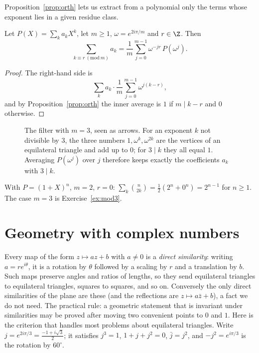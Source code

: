Proposition~\ref{prop:orth} lets us extract from a polynomial only the terms whose exponent lies in a given residue class.

\begin{theorem}\label{thm:filter}
Let $P(X)=\sum_k a_kX^k$, let $m\ge1$, $\omega=e^{2i\pi/m}$ and $r\in\Z$. Then
\[
\sum_{k\equiv r\ (\mathrm{mod}\ m)}a_k=\frac1m\sum_{j=0}^{m-1}\omega^{-jr}\,P\!\left(\omega^j\right).
\]
\end{theorem}
\begin{proof}
The right-hand side is
\[
\sum_ka_k\cdot\frac1m\sum_{j=0}^{m-1}\omega^{j(k-r)},
\]
and by Proposition~\ref{prop:orth} the inner average is $1$ if $m\mid k-r$ and $0$ otherwise.
\end{proof}

\begin{figure}[ht]
\centering
{}
\caption{The filter with $m=3$, seen as arrows. For an exponent $k$ not divisible by $3$, the three numbers $1,\omega^k,\omega^{2k}$ are the vertices of an equilateral triangle and add up to $0$; for $3\mid k$ they all equal $1$. Averaging $P(\omega^j)$ over $j$ therefore keeps exactly the coefficients $a_k$ with $3\mid k$.}
\label{fig:filter}
\end{figure}

\begin{example}
With $P=(1+X)^n$, $m=2$, $r=0$: $\sum_k\binom n{2k}=\frac12\left(2^n+0^n\right)=2^{n-1}$ for $n\ge1$.
The case $m=3$ is Exercise~\ref{ex:mod3}.
\end{example}

\section{Geometry with complex numbers}

Every map of the form $z\mapsto az+b$ with $a\ne0$ is a \emph{direct similarity}: writing $a=re^{i\theta}$, it is a rotation by $\theta$ followed by a
scaling by $r$ and a translation by $b$. Such maps preserve angles and ratios of lengths, so they send equilateral triangles to equilateral triangles,
squares to squares, and so on. Conversely the only direct similarities of the plane are these (and the reflections are $z\mapsto a\bar z+b$), a fact we do not need.
The practical rule: a geometric statement that is invariant under similarities may be proved after moving two convenient points to $0$ and $1$.
Here is the criterion that handles most problems about equilateral triangles. Write $j=e^{2i\pi/3}=\frac{-1+i\sqrt3}2$; it satisfies $j^3=1$, $1+j+j^2=0$, $\bar j=j^2$,
and $-j^2=e^{i\pi/3}$ is the rotation by $60^\circ$.

